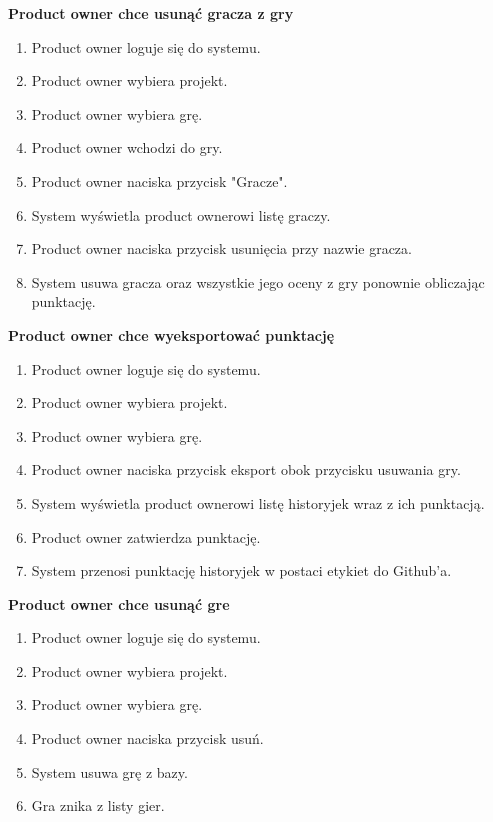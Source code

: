 \textbf{Product owner chce usunąć gracza z gry}
\begin{enumerate}
    \item Product owner loguje się do systemu.
    \item Product owner wybiera projekt.
    \item Product owner wybiera grę.
    \item Product owner wchodzi do gry.
    \item Product owner naciska przycisk "Gracze".
    \item System wyświetla product ownerowi listę graczy.
    \item Product owner naciska przycisk usunięcia przy nazwie gracza.
    \item System usuwa gracza oraz wszystkie jego oceny z gry ponownie obliczając punktację.
\end{enumerate}
\textbf{Product owner chce wyeksportować punktację}
\begin{enumerate}
    \item Product owner loguje się do systemu.
    \item Product owner wybiera projekt.
    \item Product owner wybiera grę.
    \item Product owner naciska przycisk eksport obok przycisku usuwania gry.
    \item System wyświetla product ownerowi listę historyjek wraz z ich punktacją.
    \item Product owner zatwierdza punktację.
    \item System przenosi punktację historyjek w postaci etykiet do Github'a.
\end{enumerate}
\textbf{Product owner chce usunąć gre}
\begin{enumerate}
    \item Product owner loguje się do systemu.
    \item Product owner wybiera projekt.
    \item Product owner wybiera grę.
    \item Product owner naciska przycisk usuń.
    \item System usuwa grę z bazy.
    \item Gra znika z listy gier.
\end{enumerate}
